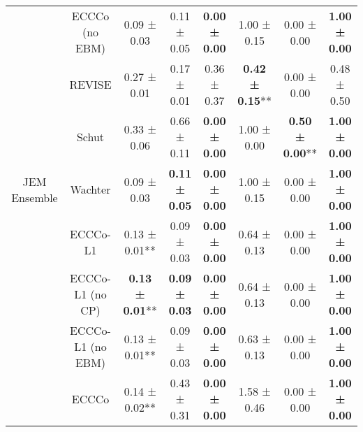 \begin{table}
{\begin{tabular}[t]{cccccccc}
 & ECCCo (no EBM) & 0.09 ± 0.03\hphantom{*}\hphantom{*} & 0.11 ± 0.05\hphantom{*}\hphantom{*} & \textbf{0.00 ± 0.00}\hphantom{*}\hphantom{*} & 1.00 ± 0.15\hphantom{*}\hphantom{*} & 0.00 ± 0.00\hphantom{*}\hphantom{*} & \textbf{1.00 ± 0.00}\hphantom{*}\hphantom{*}\\

 & REVISE & 0.27 ± 0.01\hphantom{*}\hphantom{*} & 0.17 ± 0.01\hphantom{*}\hphantom{*} & 0.36 ± 0.37\hphantom{*}\hphantom{*} & \textbf{0.42 ± 0.15}** & 0.00 ± 0.00\hphantom{*}\hphantom{*} & 0.48 ± 0.50\hphantom{*}\hphantom{*}\\

 & Schut & 0.33 ± 0.06\hphantom{*}\hphantom{*} & 0.66 ± 0.11\hphantom{*}\hphantom{*} & \textbf{0.00 ± 0.00}\hphantom{*}\hphantom{*} & 1.00 ± 0.00\hphantom{*}\hphantom{*} & \textbf{0.50 ± 0.00}** & \textbf{1.00 ± 0.00}\hphantom{*}\hphantom{*}\\

\multirow[t]{-9}{*}{\centering\arraybackslash JEM Ensemble} & Wachter & 0.09 ± 0.03\hphantom{*}\hphantom{*} & \textbf{0.11 ± 0.05}\hphantom{*}\hphantom{*} & \textbf{0.00 ± 0.00}\hphantom{*}\hphantom{*} & 1.00 ± 0.15\hphantom{*}\hphantom{*} & 0.00 ± 0.00\hphantom{*}\hphantom{*} & \textbf{1.00 ± 0.00}\hphantom{*}\hphantom{*}\\
\cmidrule{1-8}
 & ECCCo-L1 & 0.13 ± 0.01** & 0.09 ± 0.03\hphantom{*}\hphantom{*} & \textbf{0.00 ± 0.00}\hphantom{*}\hphantom{*} & 0.64 ± 0.13\hphantom{*}\hphantom{*} & 0.00 ± 0.00\hphantom{*}\hphantom{*} & \textbf{1.00 ± 0.00}\hphantom{*}\hphantom{*}\\

 & ECCCo-L1 (no CP) & \textbf{0.13 ± 0.01}** & \textbf{0.09 ± 0.03}\hphantom{*}\hphantom{*} & \textbf{0.00 ± 0.00}\hphantom{*}\hphantom{*} & 0.64 ± 0.13\hphantom{*}\hphantom{*} & 0.00 ± 0.00\hphantom{*}\hphantom{*} & \textbf{1.00 ± 0.00}\hphantom{*}\hphantom{*}\\

 & ECCCo-L1 (no EBM) & 0.13 ± 0.01** & 0.09 ± 0.03\hphantom{*}\hphantom{*} & \textbf{0.00 ± 0.00}\hphantom{*}\hphantom{*} & 0.63 ± 0.13\hphantom{*}\hphantom{*} & 0.00 ± 0.00\hphantom{*}\hphantom{*} & \textbf{1.00 ± 0.00}\hphantom{*}\hphantom{*}\\

 & ECCCo & 0.14 ± 0.02** & 0.43 ± 0.31\hphantom{*}\hphantom{*} & \textbf{0.00 ± 0.00}\hphantom{*}\hphantom{*} & 1.58 ± 0.46\hphantom{*}\hphantom{*} & 0.00 ± 0.00\hphantom{*}\hphantom{*} & \textbf{1.00 ± 0.00}\hphantom{*}\hphantom{*}\\


\end{tabular}}
\end{table}
